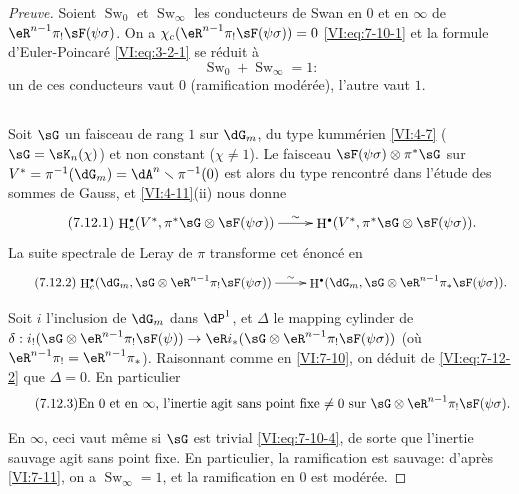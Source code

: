 \documentclass[oneside]{book}
\DeclareMathOperator{\h}{H}
\DeclareMathOperator{\swan}{Sw}
\renewcommand{\setminus}{\smallsetminus}
\theoremstyle{sga-source}
\theoremstyle{sga-source-dash}
\theoremstyle{sga-source-dotdash}
\theoremstyle{sga-source-number-note-dash}
\theoremstyle{sga-source-note-number-dotdash}
\theoremstyle{sga-source-example-dotdash}
\theoremstyle{sga-source-inline-number}
\theoremstyle{sga-source-bare-number}
\theoremstyle{sga-source}
\let\oldbullet\bullet
\renewcommand{\bullet}{\textnormal{\tiny$\oldbullet$}}
\begin{document}
\begin{proof}[Preuve]
Soient $\swan_0$ et $\swan_\infty$ les conducteurs de Swan en $0$ et en 
$\infty$ de $\eR^{n-1} \pi_! \sF(\psi\sigma)$. On a 
$\chi_c(\eR^{n-1} \pi_! \sF(\psi\sigma))=0$ \eqref{VI:eq:7-10-1} et la formule 
d'Euler-Poincaré \eqref{VI:eq:3-2-1} se réduit à 
\begin{equation*}\tag{7.11.1}\label{VI:eq:7-11-1}
  \swan_0 + \swan_\infty =1 \text{:} 
\end{equation*}
un de ces conducteurs vaut $0$ (ramification modérée), l'autre vaut $1$. 





\subsection{}\label{VI:7-12}

Soit $\sG$ un faisceau de rang $1$ sur $\dG_m$, du type kummérien 
\ref{VI:4-7} ($\sG=\sK_n(\chi)$) et non constant ($\chi\ne 1$). Le faisceau 
$\sF(\psi\sigma)\otimes \pi^\ast \sG$ sur 
$V^\ast=\pi^{-1}(\dG_m) = \dA^n\setminus \pi^{-1}(0)$ est alors du type 
rencontré dans l'étude des sommes de Gauss, et \ref{VI:4-11}(ii) nous donne 
\begin{equation*}\tag{7.12.1}\label{VI:eq:7-12-1}
\xymatrix{
  \h_c^\bullet(V^\ast,\pi^\ast\sG\otimes \sF(\psi\sigma)) \ar[r]^-\sim 
    & \h^\bullet(V^\ast,\pi^\ast \sG\otimes \sF(\psi\sigma)) \text{.} 
}
\end{equation*}
La suite spectrale de Leray de $\pi$ transforme cet énoncé en 
\begin{equation*}\tag{7.12.2}\label{VI:eq:7-12-2}
\xymatrix{
  \h_c^\bullet(\dG_m,\sG\otimes \eR^{n-1} \pi_! \sF(\psi\sigma)) \ar[r]^-\sim 
    & \h^\bullet(\dG_m,\sG\otimes \eR^{n-1} \pi_\ast \sF(\psi\sigma)) \text{.} 
}
\end{equation*}

Soit $i$ l'inclusion de $\dG_m$ dans $\dP^1$, et $\Delta$ le mapping cylinder 
de 
$\delta:i_!(\sG\otimes \eR^{n-1}\pi_! \sF(\psi))\to \eR i_\ast (\sG\otimes \eR^{n-1} \pi_! \sF(\psi\sigma))$
(où $\eR^{n-1} \pi_! = \eR^{n-1}\pi_\ast$). Raisonnant comme en 
\ref{VI:7-10}, on déduit de \eqref{VI:eq:7-12-2} que $\Delta=0$. En 
particulier 
\begin{equation*}\tag{7.12.3}\label{VI:eq:7-12-3}
  \text{En $0$ et en $\infty$, l'inertie agit sans point fixe $\ne 0$ sur $\sG\otimes \eR^{n-1}\pi_! \sF(\psi\sigma)$.}
\end{equation*}

En $\infty$, ceci vaut même si $\sG$ est trivial \eqref{VI:eq:7-10-4}, de 
sorte que l'inertie sauvage agit sans point fixe. En particulier, la 
ramification est sauvage: d'après \ref{VI:7-11}, on a $\swan_\infty=1$, et la 
ramification en $0$ est modérée. 


\end{proof}
\end{document}

